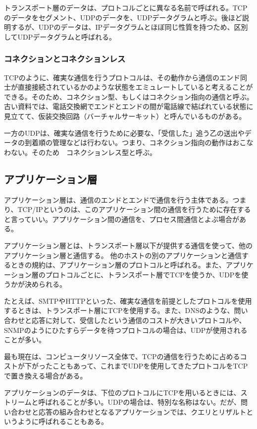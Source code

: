 トランスポート層のデータは、プロトコルごとに異なる名前で呼ばれる。TCPのデータをセグメント、UDPのデータを、UDPデータグラムと呼ぶ。後ほど説明するが、UDPのデータは、IPデータグラムとほぼ同じ性質を持つため、区別してUDPデータグラムと呼ばれる。

\subsubsection{コネクションとコネクションレス}
TCPのように、確実な通信を行うプロトコルは、その動作から通信のエンド同士が直接接続されているかのような状態をエミュレートしていると考えることができる。そのため、コネクション型、もしくはコネクション指向の通信と呼ぶ。古い資料では、電話交換網でエンドとエンドの間が電話線で結ばれている状態に見立てて、仮装交換回路（バーチャルサーキット）と呼んでいるものがある。

一方のUDPは、確実な通信を行うために必要な、「受信した」追う乙の送出やデータの到着順の管理などは行わない。つまり、コネクション指向の動作はおこなわない。そのため　コネクションレス型と呼ぶ。


\subsection{アプリケーション層}
アプリケーション層は、通信のエンドとエンドで通信を行う主体である。つまり、TCP/IPというのは、このアプリケーション間の通信を行うために存在すると言っていい。アプリケーション間の通信を、プロセス間通信とよぶ場合がある。

アプリケーション層とは、トランスポート層以下が提供する通信を使って、他のアプリケーション層と通信する。
他のホストの別のアプリケーションと通信するときの規約は、アプリケーション層のプロトコルと呼ばれる。また、アプリケーション層のプロトコルごとに、トランスポート層でTCPを使うか、UDPを使うかが決められる。

たとえば、SMTPやHTTPといった、確実な通信を前提としたプロトコルを使用するときは、トランスポート層にTCPを使用する。また、DNSのような、問い合わせと応答に対して、受信したという通信のコストが大きいプロトコルや、SNMPのようにひたすらデータを待つプロトコルの場合は、UDPが使用されることが多い。

最も現在は、コンピュータリソース全体で、TCPの通信を行うために占めるコストが下がったこともあって、これまでUDPを使用してきたプロトコルをTCPで置き換える場合がある。

アプリケーションのデータは、下位のプロトコルにTCPを用いるときには、ストリームと呼ばれることが多い。UDPの場合は、特別な名称はない。だが、問い合わせと応答の組み合わせとなるアプリケーションでは、クエリとリザルトというように呼ばれることもある。

